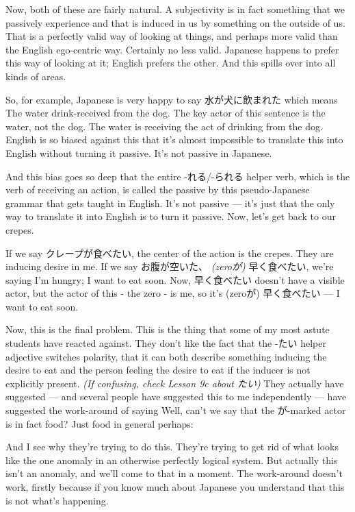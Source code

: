 Now, both of these are fairly natural. A subjectivity is in fact something that we passively experience and that is induced in us by something on the outside of us. That is a perfectly valid way of looking at things, and perhaps more valid than the English ego-centric way. Certainly no less valid. Japanese happens to prefer this way of looking at it; English prefers the other. And this spills over into all kinds of areas.

So, for example, Japanese is very happy to say 水が犬に飲まれた which means The water drink-received from the dog. The key actor of this sentence is the water, not the dog. The water is receiving the act of drinking from the dog. English is so biased against this that it's almost impossible to translate this into English without turning it passive. It's not passive in Japanese.

And this bias goes so deep that the entire -れる/-られる helper verb, which is the verb of receiving an action, is called the passive by this pseudo-Japanese grammar that gets taught in English. It's not passive --- it's just that the only way to translate it into English is to turn it passive. Now, let's get back to our crepes.

If we say クレープが食べたい, the center of the action is the crepes. They are inducing desire in me. If we say お腹が空いた、 {\em (zeroが)} 早く食べたい, we're saying I'm hungry; I want to eat soon. Now, 早く食べたい doesn't have a visible actor, but the actor of this - the zero - is me, so it's (zeroが) 早く食べたい --- I want to eat soon.

{}

Now, this is the final problem. This is the thing that some of my most astute students have reacted against. They don't like the fact that the -たい helper adjective switches polarity, that it can both describe something inducing the desire to eat and the person feeling the desire to eat if the inducer is not explicitly present. {\em (If confusing, check Lesson 9c about たい)} They actually have suggested --- and several people have suggested this to me independently --- have suggested the work-around of saying Well, can't we say that the が-marked actor is in fact food? Just food in general perhaps: 

And I see why they're trying to do this. They're trying to get rid of what looks like the one anomaly in an otherwise perfectly logical system. But actually this isn't an anomaly, and we'll come to that in a moment. The work-around doesn't work, firstly because if you know much about Japanese you understand that this is not what's happening.

